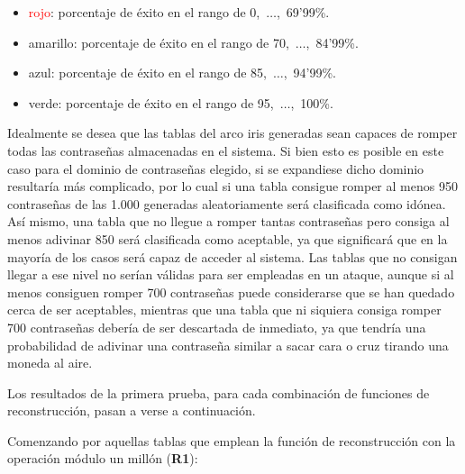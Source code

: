 \documentclass[12pt,spanish,listoffigures,listoftables]{tfgetsinf}
\begin{document}
\begin{itemize}

    \item \textcolor{red}{rojo}: porcentaje de éxito en el rango de 0,~$\dots$,~69'99\%.
    
    \item \textcolor{y}{amarillo}: porcentaje de éxito en el rango de 70,~$\dots$,~84'99\%.
    
    \item \textcolor{b}{azul}: porcentaje de éxito en el rango de 85,~$\dots$,~94'99\%.
    
    \item \textcolor{g}{verde}: porcentaje de éxito en el rango de 95,~$\dots$,~100\%.
    
\end{itemize}

Idealmente se desea que las tablas del arco iris generadas sean capaces de romper todas las contraseñas almacenadas en el sistema. Si bien esto es posible en este caso para el dominio de contraseñas elegido, si se expandiese dicho dominio resultaría más complicado, por lo cual si una tabla consigue romper al menos 950 contraseñas de las 1.000 generadas aleatoriamente será clasificada como idónea. Así mismo, una tabla que no llegue a romper tantas contraseñas pero consiga al menos adivinar 850 será clasificada como aceptable, ya que significará que en la mayoría de los casos será capaz de acceder al sistema. Las tablas que no consigan llegar a ese nivel no serían válidas para ser empleadas en un ataque, aunque si al menos consiguen romper 700 contraseñas puede considerarse que se han quedado cerca de ser aceptables, mientras que una tabla que ni siquiera consiga romper 700 contraseñas debería de ser descartada de inmediato, ya que tendría una probabilidad de adivinar una contraseña similar a sacar cara o cruz tirando una moneda al aire.

Los resultados de la primera prueba, para cada combinación de funciones de reconstrucción, pasan a verse a continuación.

Comenzando por aquellas tablas que emplean la función de reconstrucción con la operación módulo un millón (\textbf{R1}):
\end{document}
